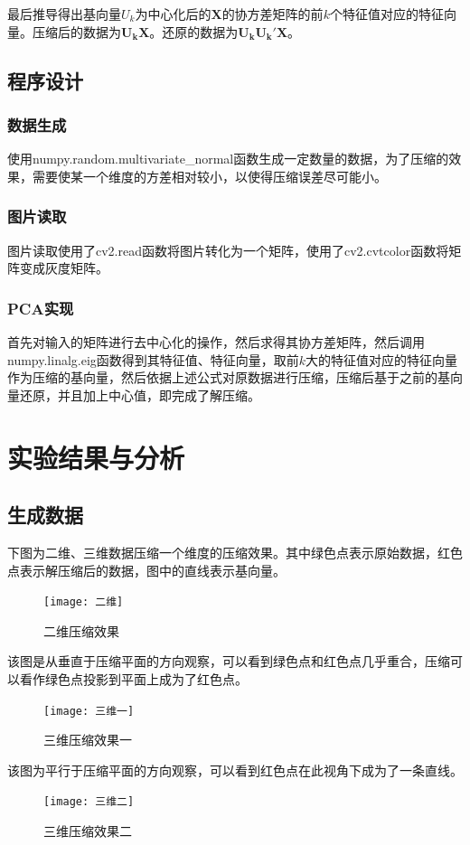 \documentclass[withoutpreface,bwprint]{cumcmthesis}
\begin{document}
最后推导得出基向量$U_{k}$为中心化后的$\boldsymbol{X}$的协方差矩阵的前$k$个特征值对应的特征向量。压缩后的数据为$\boldsymbol{U_{k}X}$。还原的数据为$\boldsymbol{U_{k}U_{k}'X}$。

\subsection{程序设计}
\subsubsection{数据生成}
使用numpy.random.multivariate\_normal函数生成一定数量的数据，为了压缩的效果，需要使某一个维度的方差相对较小，以使得压缩误差尽可能小。

\subsubsection{图片读取}
图片读取使用了cv2.read函数将图片转化为一个矩阵，使用了cv2.cvtcolor函数将矩阵变成灰度矩阵。

\subsubsection{PCA实现}
首先对输入的矩阵进行去中心化的操作，然后求得其协方差矩阵，然后调用numpy.linalg.eig函数得到其特征值、特征向量，取前$k$大的特征值对应的特征向量作为压缩的基向量，然后依据上述公式对原数据进行压缩，压缩后基于之前的基向量还原，并且加上中心值，即完成了解压缩。

\section{实验结果与分析}
\subsection{生成数据}
下图为二维、三维数据压缩一个维度的压缩效果。其中绿色点表示原始数据，红色点表示解压缩后的数据，图中的直线表示基向量。
\begin{figure}[H]
    \centering
    \texttt{[image: 二维]}
    \caption{二维压缩效果}
    \label{图1}
\end{figure}
该图是从垂直于压缩平面的方向观察，可以看到绿色点和红色点几乎重合，压缩可以看作绿色点投影到平面上成为了红色点。
\begin{figure}[H]
    \centering
    \texttt{[image: 三维一]}
    \caption{三维压缩效果一}
    \label{图2}
\end{figure}
该图为平行于压缩平面的方向观察，可以看到红色点在此视角下成为了一条直线。
\begin{figure}[H]
    \centering
    \texttt{[image: 三维二]}
    \caption{三维压缩效果二}
    \label{图3}
\end{figure}
\end{document}
